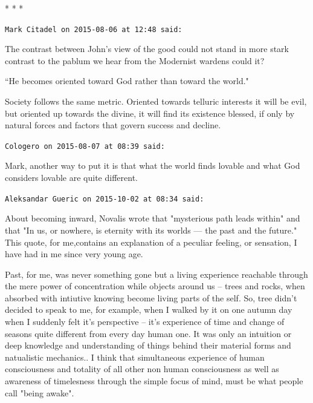 
\begin{center}* * *\end{center}

\begin{footnotesize}\begin{sffamily}



\texttt{Mark Citadel on 2015-08-06 at 12:48 said: }

The contrast between John's view of the good could not stand in more stark contrast to the pablum we hear from the Modernist wardens could it?

``He becomes oriented toward God rather than toward the world."

Society follows the same metric. Oriented towards telluric interests it will be evil, but oriented up towards the divine, it will find its existence blessed, if only by natural forces and factors that govern success and decline.


\hfill

\texttt{Cologero on 2015-08-07 at 08:39 said: }

Mark, another way to put it is that what the world finds lovable and what God considers lovable are quite different.


\hfill

\texttt{Aleksandar Gueric on 2015-10-02 at 08:34 said: }

About becoming inward, Novalis wrote that "mysterious path leads within" and that "In us, or nowhere, is eternity with its worlds — the past and the future." This quote, for me,contains an explanation of a peculiar feeling, or sensation, I have had in me since very young age.

Past, for me, was never something gone but a living experience reachable through the mere power of concentration while objects around us – trees and rocks, when absorbed with intiutive knowing become living parts of the self. So, tree didn't decided to speak to me, for example, when I walked by it on one autumn day when I suddenly felt it's perspective – it's experience of time and change of seasons quite different from every day human one. It was only an intuition or deep knowledge and understanding of things behind their material forms and natualistic mechanics.. I think that simultaneous experience of human consciousness and totality of all other non human consciousness as well as awareness of timelesness through the simple focus of mind, must be what people call "being awake".


\end{sffamily}
\end{footnotesize}
